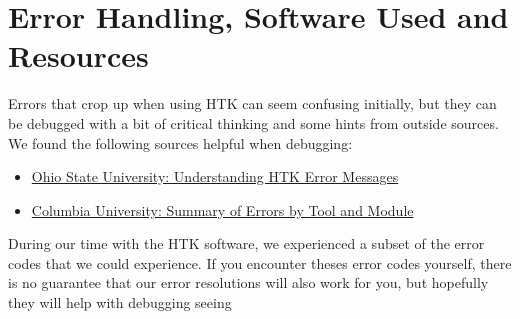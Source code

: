 \documentclass{wileySev}
\begin{document}
\part{Error Handling, Software Used and Resources}

Errors that crop up when using HTK can seem confusing initially, but they can be debugged with a bit of critical thinking and some hints from outside sources. We found the following sources helpful when debugging:
\begin{itemize}
\item \href{http://www.ling.ohio-state.edu/~bromberg/htk_problems.html}{Ohio State University: Understanding HTK Error Messages}
\item \href{http://www.ee.columbia.edu/~dpwe/LabROSA/doc/HTKBook21/node256.html}{Columbia University: Summary of Errors by Tool and Module}
\end{itemize}

During our time with the HTK software, we experienced a subset of the error codes that we could experience. If you encounter theses error codes yourself, there is no guarantee that our error resolutions will also work for you, but hopefully they will help with debugging seeing 
\end{document}
